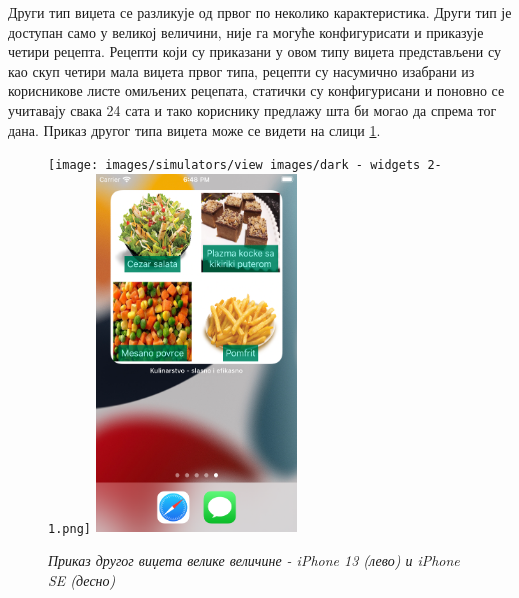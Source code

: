 \documentclass[12pt,oneside]{memoir}
\begin{document}
\indent Други тип виџета се разликује од првог по неколико карактеристика. Други тип је доступан само у великој величини, није га могуће конфигурисати и приказује четири рецепта. Рецепти који су приказани у овом типу виџета представљени су као скуп четири мала виџета првог типа, рецепти су насумично изабрани из корисникове листе омиљених рецепата, статички су конфигурисани и поновно се учитавају свака 24 сата и тако кориснику предлажу шта би могао да спрема тог дана. Приказ другог типа виџета може се видети на слици \ref{slika:приказ_виџета_3_1}.

\begin{figure} [H]
    \centering
    \captionsetup{justification=centering}
    \texttt{[image: images/simulators/view images/dark - widgets 2-1.png]} 
    \hfill
    \includegraphics[width=0.475\textwidth]{images/simulators/view images/light - widgets 2-1.png}
    \caption{\textit{Приказ другог виџета велике величине - iPhone 13 (лево) и iPhone SE (десно)}}
    \label{slika:приказ_виџета_3_1}
\end{figure}

\end{document}

